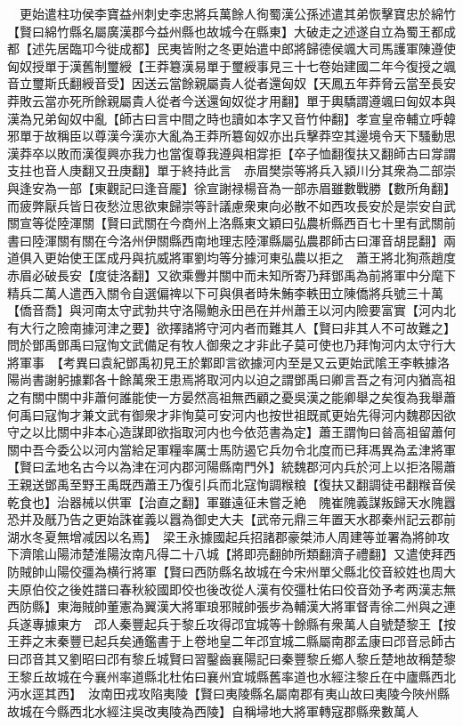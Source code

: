 　更始遣柱功侯李寶益州刺史李忠將兵萬餘人徇蜀漢公孫述遣其弟恢擊寶忠於綿竹【賢曰綿竹縣名屬廣漢郡今益州縣也故城今在縣東】大破走之述遂自立為蜀王都成都【述先居臨卭今徙成都】民夷皆附之冬更始遣中郎將歸德侯颯大司馬護軍陳遵使匈奴授單于漢舊制璽綬【王莽簒漢易單于璽綬事見三十七卷始建國二年今復授之颯音立璽斯氏翻綬音受】因送云當餘親屬貴人從者還匈奴【天鳳五年莽脅云當至長安莽敗云當亦死所餘親屬貴人從者今送還匈奴從才用翻】單于輿驕謂遵颯曰匈奴本與漢為兄弟匈奴中亂【師古曰言中間之時也讀如本字又音竹仲翻】孝宣皇帝輔立呼韓邪單于故稱臣以尊漢今漢亦大亂為王莽所簒匈奴亦出兵擊莽空其邊境令天下騷動思漢莽卒以敗而漢復興亦我力也當復尊我遵與相牚拒【卒子恤翻復扶又翻師古曰牚謂支拄也音人庚翻又丑庚翻】單于終持此言　赤眉樊崇等將兵入潁川分其衆為二部崇與逢安為一部【東觀記曰逢音龎】徐宣謝禄楊音為一部赤眉雖數戰勝【數所角翻】而疲弊厭兵皆日夜愁泣思欲東歸崇等計議慮衆東向必散不如西攻長安於是崇安自武關宣等從陸渾關【賢曰武關在今商州上洛縣東文穎曰弘農析縣西百七十里有武關前書曰陸渾關有關在今洛州伊關縣西南地理志陸渾縣屬弘農郡師古曰渾音胡昆翻】兩道俱入更始使王匡成丹與抗威將軍劉均等分據河東弘農以拒之　蕭王將北狥燕趙度赤眉必破長安【度徒洛翻】又欲乘釁并關中而未知所寄乃拜鄧禹為前將軍中分麾下精兵二萬人遣西入關令自選偏禆以下可與俱者時朱鮪李軼田立陳僑將兵號三十萬【僑音喬】與河南太守武勃共守洛陽鮑永田邑在并州蕭王以河内險要富實【河内北有大行之險南據河津之要】欲擇諸將守河内者而難其人【賢曰非其人不可故難之】問於鄧禹鄧禹曰寇恂文武備足有牧人御衆之才非此子莫可使也乃拜恂河内太守行大將軍事　【考異曰袁紀鄧禹初見王於鄴即言欲據河内至是又云更始武隂王李軼據洛陽尚書謝躬據鄴各十餘萬衆王患焉將取河内以迫之謂鄧禹曰卿言吾之有河内猶高祖之有關中關中非蕭何誰能使一方晏然高祖無西顧之憂吳漢之能卿舉之矣復為我舉蕭何禹曰寇恂才兼文武有御衆才非恂莫可安河内也按世祖既貳更始先得河内魏郡因欲守之以比關中非本心造謀即欲指取河内也今依范書為定】蕭王謂恂曰㫺高祖留蕭何關中吾今委公以河内當給足軍糧率厲士馬防遏它兵勿令北度而已拜馮異為孟津將軍【賢曰孟地名古今以為津在河内郡河陽縣南門外】統魏郡河内兵於河上以拒洛陽蕭王親送鄧禹至野王禹既西蕭王乃復引兵而北寇恂調糇粮【復扶又翻調徒弔翻糇音侯乾食也】治器械以供軍【治直之翻】軍雖遠征未嘗乏絶　隗崔隗義謀叛歸天水隗囂恐并及旤乃告之更始誅崔義以囂為御史大夫【武帝元鼎三年置天水郡秦州記云郡前湖水冬夏無增减因以名焉】　梁王永據國起兵招諸郡豪桀沛人周建等並署為將帥攻下濟隂山陽沛楚淮陽汝南凡得二十八城【將即亮翻帥所類翻濟子禮翻】又遣使拜西防賊帥山陽佼彊為横行將軍【賢曰西防縣名故城在今宋州單父縣北佼音絞姓也周大夫原伯佼之後姓譜曰春秋絞國即佼也後改從人漢有佼彊杜佑曰佼音効予考两漢志無西防縣】東海賊帥董憲為翼漢大將軍琅邪賊帥張步為輔漢大將軍督青徐二州與之連兵遂專據東方　邔人秦豐起兵于黎丘攻得邔宜城等十餘縣有衆萬人自號楚黎王【按王莽之末秦豐已起兵矣通鑑書于上卷地皇二年邔宜城二縣屬南郡孟康曰邔音忌師古曰邔音其又劉昭曰邔有黎丘城賢曰習鑿齒襄陽記曰秦豐黎丘鄉人黎丘楚地故稱楚黎王黎丘故城在今襄州率道縣北杜佑曰襄州宜城縣舊率道也水經注黎丘在中廬縣西北沔水逕其西】　汝南田戎攻陷夷陵【賢曰夷陵縣名屬南郡有夷山故曰夷陵今陜州縣故城在今縣西北水經注吳改夷陵為西陵】自稱埽地大將軍轉寇郡縣衆數萬人

